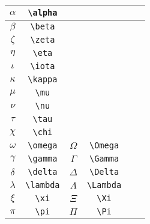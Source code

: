 \documentclass[a4paper,12pt]{standalone}
\begin{document}
\begin{tabular}{cccccc} \toprule
    \(\alpha\)      & \verb|\alpha|  &              &                         &            &                         \\ \midrule
    \(\beta\)       & \verb|\beta|  &              &                         &            &                         \\ \midrule
    \(\zeta\)       & \verb|\zeta|  &              &                         &            &                         \\ \midrule
    \(\eta\)        & \verb|\eta|  &              &                         &            &                         \\ \midrule
    \(\iota\)       & \verb|\iota|  &              &                         &            &                         \\ \midrule
    \(\kappa\)      & \verb|\kappa|  &              &                         &            &                         \\ \midrule
    \(\mu\)         & \verb|\mu|  &              &                         &            &                         \\ \midrule
    \(\nu\)         & \verb|\nu|  &              &                         &            &                         \\ \midrule
    \(\tau\)        & \verb|\tau|  &              &                         &            &                         \\ \midrule
    \(\chi\)        & \verb|\chi| &              &                         &            &                         \\ \midrule
    \(\omega\)      & \verb|\omega| & \(\Omega\)   & \verb|\Omega| &            &                         \\ \midrule
    \(\gamma\)      & \verb|\gamma| & \(\Gamma\)   & \verb|\Gamma| &            &                         \\ \midrule
    \(\delta\)      & \verb|\delta| & \(\Delta\)   & \verb|\Delta| &            &                         \\ \midrule
    \(\lambda\)     & \verb|\lambda| & \(\Lambda\)  & \verb|\Lambda| &            &                         \\ \midrule
    \(\xi\)         & \verb|\xi| & \(\Xi\)      & \verb|\Xi| &            &                         \\ \midrule
    \(\pi\)         & \verb|\pi| & \(\Pi\)      & \verb|\Pi| &            &                         \\ \midrule

\end{tabular}
\end{document}
